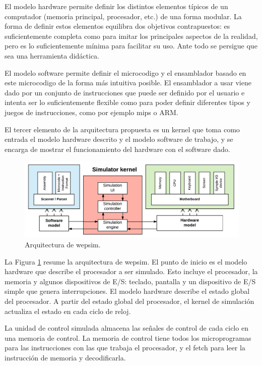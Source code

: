 El modelo \gls{hardware} permite definir los distintos elementos típicos de un computador (memoria principal, procesador, etc.) de una forma modular. La forma de definir estos elementos equilibra dos objetivos contrapuestos: es suficientemente completa como para imitar los principales aspectos de la realidad, pero es lo suficientemente mínima para facilitar su uso. Ante todo se persigue que sea una herramienta didáctica.

El modelo \gls{software} permite definir el \gls{microcodigo} y el \gls{ensamblador} basado en este \gls{microcodigo} de la forma más intuitiva posible. El \gls{ensamblador} a usar viene dado por un conjunto de instrucciones que puede ser definido por el usuario e intenta ser lo suficientemente flexible como para poder definir diferentes tipos y juegos de instrucciones, como por ejemplo \acrshort{mips} o ARM.

El tercer elemento de la arquitectura propuesta es un kernel que toma como entrada el modelo \gls{hardware} descrito y el modelo \gls{software} de trabajo, y se encarga de mostrar el funcionamiento del \gls{hardware} con el \gls{software} dado.

\begin{figure}[htbp]
 	\centering
 	\includegraphics[width=14cm]{figures/architecture_diagram}
 	\caption{Arquitectura de \acrshort{wepsim}.}
	\label{fig:architecture_diagram}
\end{figure}

La Figura \ref{fig:architecture_diagram} resume la arquitectura de \acrshort{wepsim}. El punto de inicio es el modelo \gls{hardware} que describe el procesador a ser simulado. Esto incluye el procesador, la memoria y algunos dispositivos de E/S: teclado, pantalla y un dispositivo de E/S simple que genera interrupciones. El modelo \gls{hardware} describe el estado global del procesador. A partir del estado global del procesador, el kernel de simulación actualiza el estado en cada ciclo de reloj.

La unidad de control simulada almacena las señales de control de cada ciclo en una memoria de control. La memoria de control tiene todos los microprogramas para las instrucciones con las que trabaja el procesador, y el fetch para leer la instrucción de memoria y decodificarla.


